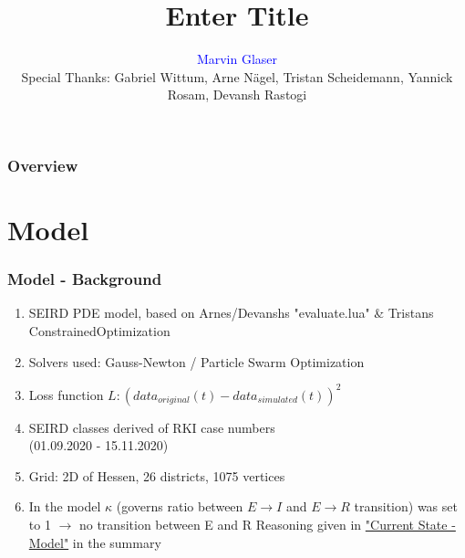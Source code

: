 \documentclass{beamer}
\title[Other thing]{Enter Title}
\author{\textcolor{blue}{Marvin Glaser\\}
\vspace{2mm}\footnotesize{Special Thanks: Gabriel Wittum, Arne N\"agel, Tristan Scheidemann, Yannick Rosam, Devansh Rastogi}} %
\institute[G-CSC] %
{
Goethe Universtiy Frankfurt - Center for Scientific Computing \\ %
\medskip
}
\begin{document}



\begin{frame}
\frametitle{Overview} 
\tableofcontents 
\end{frame}






\section{Model}
\begin{frame}
	\frametitle{Model - Background}
	\begin{enumerate}[$\bullet$]
		\item SEIRD PDE model, based on Arnes/Devanshs "evaluate.lua" \& Tristans ConstrainedOptimization
		\item Solvers used: Gauss-Newton / Particle Swarm Optimization
		\item Loss function $L: (data_{original}(t) - data_{simulated}(t))^2 $
		\item SEIRD classes derived of RKI case numbers\\(01.09.2020 - 15.11.2020)
		\item Grid: 2D of Hessen, 26 districts, 1075 vertices
		\item In the model $\kappa$ (governs ratio between $E\rightarrow I$ and $E\rightarrow R$ transition) was set to 1
			$\rightarrow$ no transition between E and R
			Reasoning given in \hyperlink{sec:StateModel}{"Current State - Model"} in the summary
	\end{enumerate}

\end{frame}
\end{document}
